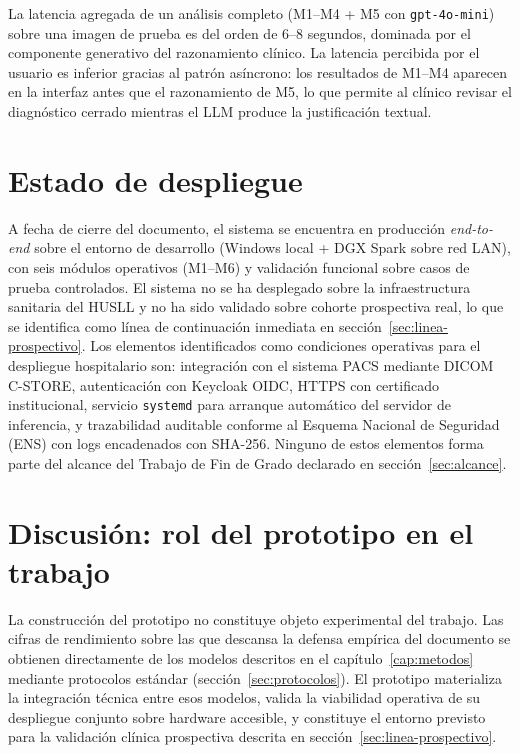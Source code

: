 La latencia agregada de un análisis completo
(M1--M4 + M5 con \texttt{gpt-4o-mini}) sobre una imagen de
prueba es del orden de $6$--$8$ segundos, dominada por el
componente generativo del razonamiento clínico. La latencia
percibida por el usuario es inferior gracias al patrón asíncrono:
los resultados de M1--M4 aparecen en la interfaz antes que el
razonamiento de M5, lo que permite al clínico revisar el
diagnóstico cerrado mientras el LLM produce la justificación
textual.

\section{Estado de despliegue}
\label{sec:dermapixel-estado}

A fecha de cierre del documento, el sistema se encuentra en
producción \emph{end-to-end} sobre el entorno de desarrollo
(Windows local + DGX Spark sobre red LAN), con seis módulos
operativos (M1--M6) y validación funcional sobre casos de prueba
controlados. El sistema no se ha desplegado sobre la
infraestructura sanitaria del HUSLL y no ha sido validado sobre
cohorte prospectiva real, lo que se identifica como línea de
continuación inmediata en secci\'on~\ref{sec:linea-prospectivo}. Los
elementos identificados como condiciones operativas para el
despliegue hospitalario son: integración con el sistema PACS
mediante DICOM C-STORE, autenticación con Keycloak OIDC, HTTPS
con certificado institucional, servicio \texttt{systemd} para
arranque automático del servidor de inferencia, y trazabilidad
auditable conforme al Esquema Nacional de Seguridad (ENS) con
logs encadenados con SHA-256. Ninguno de estos elementos forma
parte del alcance del Trabajo de Fin de Grado declarado en
secci\'on~\ref{sec:alcance}.

\section{Discusión: rol del prototipo en el trabajo}
\label{sec:dermapixel-discusion}

La construcción del prototipo no constituye objeto experimental
del trabajo. Las cifras de rendimiento sobre las que descansa la
defensa empírica del documento se obtienen directamente de los
modelos descritos en el capítulo~\ref{cap:metodos} mediante
protocolos estándar (secci\'on~\ref{sec:protocolos}). El prototipo
materializa la integración técnica entre esos modelos, valida la
viabilidad operativa de su despliegue conjunto sobre hardware
accesible, y constituye el entorno previsto para la validación
clínica prospectiva descrita en secci\'on~\ref{sec:linea-prospectivo}.

